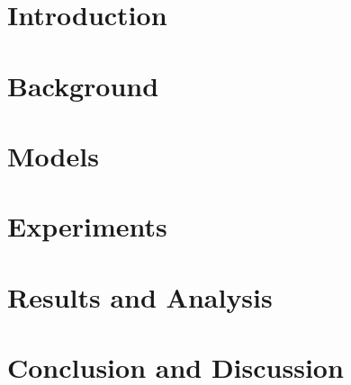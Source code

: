 \begin{abstract}
\end{abstract}


\section{Introduction}
\label{sec: intro}
\cite{ACM:83}

\section{Background}
\label{sec: background}

\section{Models}
\label{sec: models}

\section{Experiments}
\label{sec: experiments}

\section{Results and Analysis}
\label{sec: results}

\section{Conclusion and Discussion}
\label{sec: conclusion}